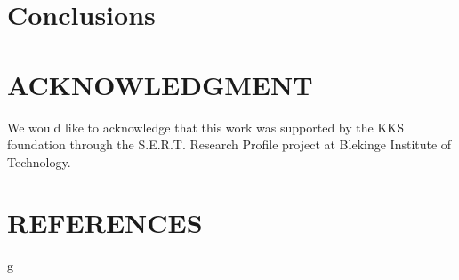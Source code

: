 \documentclass{article}
\begin{document}
\section{Conclusions}





\section*{ACKNOWLEDGMENT}
We would like to acknowledge that this work was supported by the KKS foundation through the S.E.R.T. Research Profile project at Blekinge Institute of Technology.

\section*{REFERENCES}


g
\end{document}
